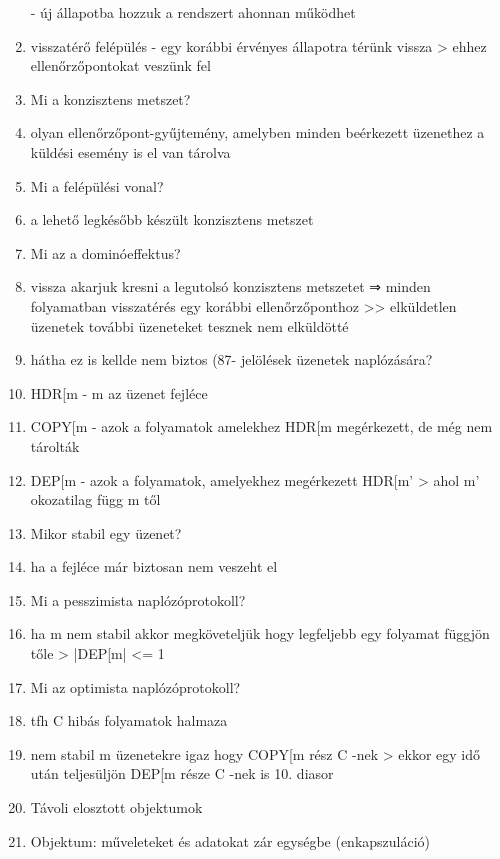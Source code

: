 \documentclass[twoside, a4paper, 12pt]{article}
\begin{document}
\begin{enumerate}
                - új állapotba hozzuk a rendszert ahonnan működhet
            \item visszatérő felépülés
                - egy korábbi érvényes állapotra térünk vissza
                > ehhez ellenőrzőpontokat veszünk fel
            \item  Mi a konzisztens metszet?
            \item olyan ellenőrzőpont-gyűjtemény, amelyben minden beérkezett üzenethez a küldési esemény is el van tárolva
            \item  Mi a felépülési vonal?
            \item a lehető legkésőbb készült konzisztens metszet
            \item  Mi az a dominóeffektus?
            \item vissza akarjuk kresni a legutolsó konzisztens metszetet
                ⇒ minden folyamatban visszatérés egy korábbi ellenőrzőponthoz
                >> elküldetlen üzenetek további üzeneteket tesznek nem elküldötté
            \item hátha ez is kellde nem biztos (87-
                jelölések üzenetek naplózására?
            \item HDR[m 
                - m az üzenet fejléce 
            \item COPY[m
                - azok a folyamatok amelekhez HDR[m megérkezett, de még nem tárolták
            \item DEP[m
                - azok a folyamatok, amelyekhez megérkezett HDR[m' 
                > ahol m' okozatilag függ m től
            \item  Mikor stabil egy üzenet?
            \item ha a fejléce már biztosan nem veszeht el
            \item  Mi a pesszimista naplózóprotokoll?
            \item ha m nem stabil akkor megköveteljük hogy legfeljebb egy folyamat függjön tőle
                > |DEP[m| <= 1
            \item  Mi az optimista naplózóprotokoll?
            \item tfh C hibás folyamatok halmaza
            \item nem stabil m üzenetekre igaz hogy COPY[m rész C -nek
                > ekkor egy idő után teljesüljön DEP[m része C -nek  is 
                10. diasor
            \item  Távoli elosztott objektumok
            \item Objektum: műveleteket és adatokat zár egységbe (enkapszuláció)

\end{enumerate}
\end{document}
